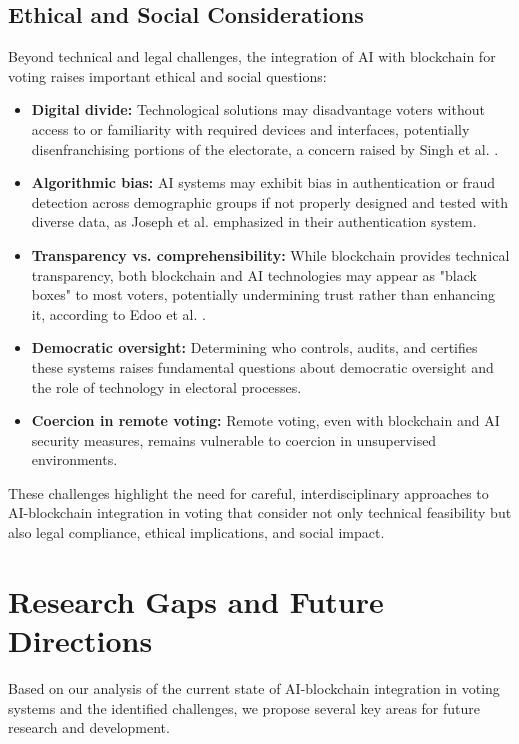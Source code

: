 \documentclass[conference]{IEEEtran}
\begin{document}
\subsection{Ethical and Social Considerations}
Beyond technical and legal challenges, the integration of AI with blockchain for voting raises important ethical and social questions:

\begin{itemize}
    \item \textbf{Digital divide:} Technological solutions may disadvantage voters without access to or familiarity with required devices and interfaces, potentially disenfranchising portions of the electorate, a concern raised by Singh et al. \cite{b5}.
    
    \item \textbf{Algorithmic bias:} AI systems may exhibit bias in authentication or fraud detection across demographic groups if not properly designed and tested with diverse data, as Joseph et al. \cite{b6} emphasized in their authentication system.
    
    \item \textbf{Transparency vs. comprehensibility:} While blockchain provides technical transparency, both blockchain and AI technologies may appear as "black boxes" to most voters, potentially undermining trust rather than enhancing it, according to Edoo et al. \cite{b7}.
    
    \item \textbf{Democratic oversight:} Determining who controls, audits, and certifies these systems raises fundamental questions about democratic oversight and the role of technology in electoral processes.
    
    \item \textbf{Coercion in remote voting:} Remote voting, even with blockchain and AI security measures, remains vulnerable to coercion in unsupervised environments.
\end{itemize}

These challenges highlight the need for careful, interdisciplinary approaches to AI-blockchain integration in voting that consider not only technical feasibility but also legal compliance, ethical implications, and social impact.

\section{Research Gaps and Future Directions}
Based on our analysis of the current state of AI-blockchain integration in voting systems and the identified challenges, we propose several key areas for future research and development.
\end{document}
